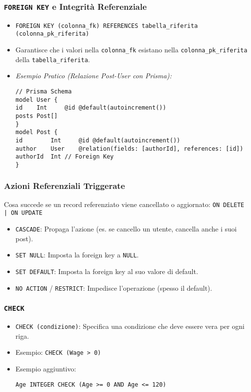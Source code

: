 \subsubsection{\texttt{FOREIGN KEY} e Integrità Referenziale}
\begin{itemize}
	\item \texttt{FOREIGN KEY (colonna\_fk) REFERENCES tabella\_riferita (colonna\_pk\_riferita)}
	\item Garantisce che i valori nella \texttt{colonna\_fk} esistano nella \texttt{colonna\_pk\_riferita} della \texttt{tabella\_riferita}.
	\item \textit{Esempio Pratico (Relazione Post-User con Prisma):}
	\begin{verbatim}
// Prisma Schema
model User {
id    Int     @id @default(autoincrement())
posts Post[]
}
model Post {
id        Int     @id @default(autoincrement())
author    User    @relation(fields: [authorId], references: [id])
authorId  Int // Foreign Key
}
	\end{verbatim}
\end{itemize}
\subsubsection{Azioni Referenziali Triggerate}
Cosa succede se un record referenziato viene cancellato o aggiornato: \texttt{ON DELETE | ON UPDATE}
\begin{itemize}
	\item \texttt{CASCADE}: Propaga l'azione (es. se cancello un utente, cancella anche i suoi post).
	\item \texttt{SET NULL}: Imposta la foreign key a \texttt{NULL}.
	\item \texttt{SET DEFAULT}: Imposta la foreign key al suo valore di default.
	\item \texttt{NO ACTION} / \texttt{RESTRICT}: Impedisce l'operazione (spesso il default).
\end{itemize}
\subsubsection{\texttt{CHECK}}
\begin{itemize}
	\item \texttt{CHECK (condizione)}: Specifica una condizione che deve essere vera per ogni riga.
	\item Esempio: \texttt{CHECK (Wage > 0)}
	\item Esempio aggiuntivo:
	\begin{verbatim}
Age INTEGER CHECK (Age >= 0 AND Age <= 120)
	\end{verbatim}
\end{itemize}

